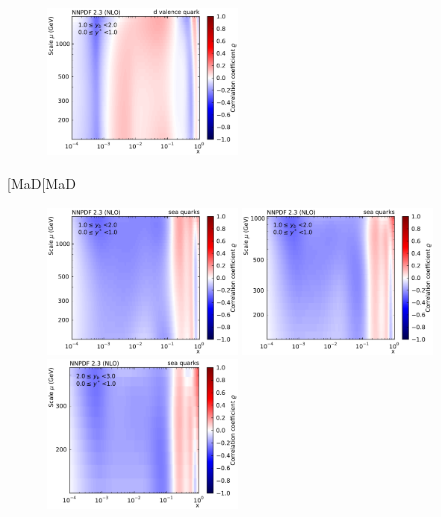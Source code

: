 \begin{figure}[htbp]
    \includegraphics[width=0.45\textwidth]{figures/pdf_constraints/corr_PTMAXEXPYS_YBYS_NLO_FINALBINS_NNPDF23_d_valence_quark_ys0_0yb0_0_cl.pdf}\hfill
    \caption{}
    \label{fig:pdfconstraints_gluon}
\end{figure}
[MaD[MaD
\begin{figure}[htbp]
    \centering
    \includegraphics[width=0.45\textwidth]{figures/pdf_constraints/corr_PTMAXEXPYS_YBYS_NLO_FINALBINS_NNPDF23_sea_quarks_ys0_0yb0_0_cl.pdf}\hfill
    \includegraphics[width=0.45\textwidth]{figures/pdf_constraints/corr_PTMAXEXPYS_YBYS_NLO_FINALBINS_NNPDF23_sea_quarks_ys0_0yb1_0_cl.pdf}\hfill
    \includegraphics[width=0.45\textwidth]{figures/pdf_constraints/corr_PTMAXEXPYS_YBYS_NLO_FINALBINS_NNPDF23_sea_quarks_ys0_0yb2_0_cl.pdf}\hfill

\end{figure}
